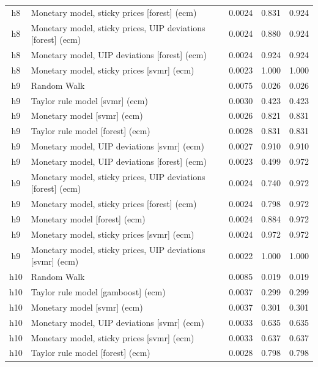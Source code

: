 \begin{ThreePartTable}
\begin{longtable}[t]{cp{5.5cm}ccc}
h8 & \raggedright Monetary model, sticky prices [forest] (ecm) & 0.0024 & 0.831 & 0.924\\
h8 & \raggedright Monetary model, sticky prices, UIP deviations [forest] (ecm) & 0.0024 & 0.880 & 0.924\\
h8 & \raggedright Monetary model, UIP deviations [forest] (ecm) & 0.0024 & 0.924 & 0.924\\
h8 & \raggedright Monetary model, sticky prices [svmr] (ecm) & 0.0023 & 1.000 & 1.000\\
\addlinespace
h9 & \raggedright Random Walk & 0.0075 & 0.026 & 0.026\\
h9 & \raggedright Taylor rule model [svmr] (ecm) & 0.0030 & 0.423 & 0.423\\
h9 & \raggedright Monetary model [svmr] (ecm) & 0.0026 & 0.821 & 0.831\\
h9 & \raggedright Taylor rule model [forest] (ecm) & 0.0028 & 0.831 & 0.831\\
h9 & \raggedright Monetary model, UIP deviations [svmr] (ecm) & 0.0027 & 0.910 & 0.910\\
h9 & \raggedright Monetary model, UIP deviations [forest] (ecm) & 0.0023 & 0.499 & 0.972\\
h9 & \raggedright Monetary model, sticky prices, UIP deviations [forest] (ecm) & 0.0024 & 0.740 & 0.972\\
h9 & \raggedright Monetary model, sticky prices [forest] (ecm) & 0.0024 & 0.798 & 0.972\\
h9 & \raggedright Monetary model [forest] (ecm) & 0.0024 & 0.884 & 0.972\\
h9 & \raggedright Monetary model, sticky prices [svmr] (ecm) & 0.0024 & 0.972 & 0.972\\
h9 & \raggedright Monetary model, sticky prices, UIP deviations [svmr] (ecm) & 0.0022 & 1.000 & 1.000\\
\addlinespace
h10 & \raggedright Random Walk & 0.0085 & 0.019 & 0.019\\
h10 & \raggedright Taylor rule model [gamboost] (ecm) & 0.0037 & 0.299 & 0.299\\
h10 & \raggedright Monetary model [svmr] (ecm) & 0.0037 & 0.301 & 0.301\\
h10 & \raggedright Monetary model, UIP deviations [svmr] (ecm) & 0.0033 & 0.635 & 0.635\\
h10 & \raggedright Monetary model, sticky prices [svmr] (ecm) & 0.0033 & 0.637 & 0.637\\
h10 & \raggedright Taylor rule model [forest] (ecm) & 0.0028 & 0.798 & 0.798\\

\end{longtable}
\end{ThreePartTable}
